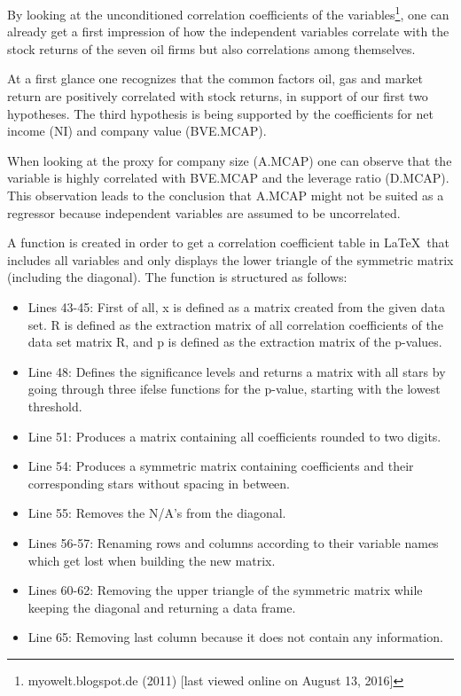 \documentclass[a4paper]{article}
\begin{document}
By looking at the unconditioned correlation coefficients of the variables\footnote{myowelt.blogspot.de (2011) [last viewed online on August 13, 2016]}, one can already get a first impression of how the independent variables correlate with the stock returns of the seven oil firms but also correlations among themselves.

At a first glance one recognizes that the common factors oil, gas and market return are positively correlated with stock returns, in support of our first two hypotheses. The third hypothesis is being supported by the coefficients for net income (NI) and company value (BVE.MCAP). 

When looking at the proxy for company size (A.MCAP) one can observe that the variable is highly correlated with BVE.MCAP and the leverage ratio (D.MCAP). This observation leads to the conclusion that A.MCAP might not be suited as a regressor because independent variables are assumed to be uncorrelated.

A function is created in order to get a correlation coefficient table in \LaTeX\ that includes all variables and only displays the lower triangle of the symmetric matrix (including the diagonal). The function is structured as follows:

\begin{itemize}
\item
Lines 43-45:	First of all, x is defined as a matrix created from the given data set. R is defined as the extraction matrix of all correlation coefficients of the data set matrix R, and p is defined as the extraction matrix of the p-values.
\item
Line 48:		Defines the significance levels and returns a matrix with all stars by going through three ifelse functions for the p-value, starting with the lowest threshold. 
\item
Line 51:		Produces a matrix containing all coefficients rounded to two digits.
\item
Line 54:		Produces a symmetric matrix containing coefficients and their corresponding stars without spacing in between.
\item
Line 55:		Removes the N/A's from the diagonal.
\item
Lines 56-57:	Renaming rows and columns according to their variable names which get lost when building the new matrix.
\item
Lines 60-62:	Removing the upper triangle of the symmetric matrix while keeping the diagonal and returning a data frame.
\item
Line 65:		Removing last column because it does not contain any information.
\end{itemize}
\end{document}
